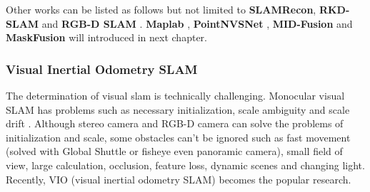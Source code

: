 \documentclass[journal,transmag]{IEEEtran}
\begin{document}
Other works can be listed as follows but not limited to \textbf{SLAMRecon}, \textbf{RKD-SLAM} \cite{liu2017robust} and \textbf{RGB-D SLAM} \cite{dai2018rgb}. \textbf{Maplab} \cite{schneider2018maplab}, \textbf{PointNVSNet} \cite{2019PointMVSNet},  \textbf{MID-Fusion}\cite{xu2018mid} and \textbf{MaskFusion} \cite{8613746} will introduced in next chapter. 
\subsubsection{Visual Inertial Odometry SLAM}
The determination of visual slam is technically challenging. Monocular visual SLAM has problems such as necessary initialization, scale ambiguity and scale drift \cite{strasdat2010scale}. Although stereo camera and RGB-D camera can solve the problems of initialization and scale, some obstacles can't be ignored such as fast movement (solved with Global Shuttle or fisheye even panoramic camera), small field of view, large calculation, occlusion, feature loss, dynamic scenes and changing light. Recently, VIO (visual inertial odometry SLAM) becomes the popular research. 
\end{document}
